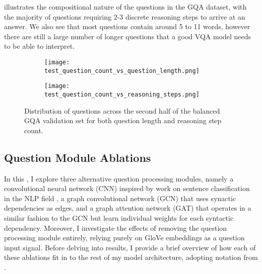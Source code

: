 \figureautorefname{ \ref{fig:test_reasoning_step_and_question_length_distribution}} illustrates the compositional nature of the questions in the GQA dataset, with the majority of questions requiring 2-3 discrete reasoning steps to arrive at an answer. We also see that most questions contain around 5 to 11 words, however there are still a large number of longer questions that a good VQA model needs to be able to interpret.

\begin{figure}[htbp]
    \centering
    \begin{subfigure}[l]{0.5\textwidth}
        \texttt{[image: test\_question\_count\_vs\_question\_length.png]}
        \label{fig:test_question_length_distribution}
    \end{subfigure}
    \begin{subfigure}[r]{0.49\textwidth}
        \texttt{[image: test\_question\_count\_vs\_reasoning\_steps.png]}
        \label{fig:test_reasoning_step_distribution}
    \end{subfigure}
    \caption[GQA question length and reasoning step count distributions.]{Distribution of questions across the second half of the balanced GQA validation set for both question length and reasoning step count.}
    \label{fig:test_reasoning_step_and_question_length_distribution}
\end{figure}



\subsection{Question Module Ablations}
\label{subsec:question_module_ablations}

In this \subsectionautorefname, I explore three alternative question processing modules, namely a convolutional neural network (CNN) inspired by work on sentence classification in the NLP field \cite{kim2014convolutional}, a graph convolutional network (GCN) that uses synactic dependencies as edges, and a graph attention network (GAT) that operates in a similar fashion to the GCN but learn individual weights for each syntactic dependency. Moreover, I investigate the effects of removing the question processing module entirely, relying purely on GloVe embeddings as a question input signal. Before delving into results, I provide a brief overview of how each of these ablations fit in to the rest of my model architecture, adopting notation from \chapterautorefname{ \ref{chapter:methodology}}.

